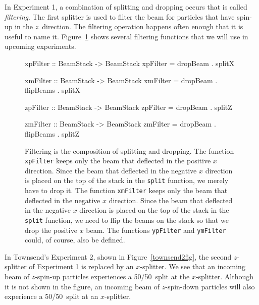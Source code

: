 \documentclass[12pt]{article}
\newcommand{\DataTypeTok}[1]{\textcolor[rgb]{0.56,0.13,0.00}{{#1}}}
\newcommand{\SpecialCharTok}[1]{\textcolor[rgb]{0.25,0.44,0.63}{{#1}}}
\newcommand{\FunctionTok}[1]{\textcolor[rgb]{0.02,0.16,0.49}{{#1}}}
\newcommand{\OperatorTok}[1]{\textcolor[rgb]{0.40,0.40,0.40}{{#1}}}
\begin{document}
In Experiment 1, a combination of splitting and dropping occurs
that is called \emph{filtering}.  The first splitter is used
to filter the beam for particles that have spin-up in the $z$~direction.
The filtering operation happens often enough that it is useful to name
it.  Figure~\ref{expapifilter} shows several filtering functions
that we will use in upcoming experiments.

\begin{figure}
\begin{Highlighting}[]
\FunctionTok{xpFilter} \SpecialCharTok{::} \DataTypeTok{BeamStack} \SpecialCharTok{->} \DataTypeTok{BeamStack}
\FunctionTok{xpFilter} \OperatorTok{=} \FunctionTok{dropBeam} \OperatorTok{.} \FunctionTok{splitX}

\FunctionTok{xmFilter} \SpecialCharTok{::} \DataTypeTok{BeamStack} \SpecialCharTok{->} \DataTypeTok{BeamStack}
\FunctionTok{xmFilter} \OperatorTok{=} \FunctionTok{dropBeam} \OperatorTok{.} \FunctionTok{flipBeams} \OperatorTok{.} \FunctionTok{splitX}

\FunctionTok{zpFilter} \SpecialCharTok{::} \DataTypeTok{BeamStack} \SpecialCharTok{->} \DataTypeTok{BeamStack}
\FunctionTok{zpFilter} \OperatorTok{=} \FunctionTok{dropBeam} \OperatorTok{.} \FunctionTok{splitZ}

\FunctionTok{zmFilter} \SpecialCharTok{::} \DataTypeTok{BeamStack} \SpecialCharTok{->} \DataTypeTok{BeamStack}
\FunctionTok{zmFilter} \OperatorTok{=} \FunctionTok{dropBeam} \OperatorTok{.} \FunctionTok{flipBeams} \OperatorTok{.} \FunctionTok{splitZ}
\end{Highlighting}
\caption{Filtering is the composition of splitting and dropping.
  The function \FunctionTok{\texttt{xpFilter}} keeps only the beam that deflected in the positive $x$ direction.
  Since the beam that deflected in the negative $x$ direction is placed on the top of the stack
  in the \FunctionTok{\texttt{split}} function, we merely have to drop it.
  The function \FunctionTok{\texttt{xmFilter}} keeps only the beam that deflected in the negative $x$ direction.
  Since the beam that deflected in the negative $x$ direction is placed on the top of the stack
  in the \FunctionTok{\texttt{split}} function, we need to flip the beams on the stack so that we
  drop the positive $x$ beam.
  The functions \FunctionTok{\texttt{ypFilter}} and \FunctionTok{\texttt{ymFilter}} could,
  of course, also be defined.
}
\label{expapifilter}
\end{figure}

In Townsend's Experiment 2, shown in Figure~\ref{townsend2fig},
the second $z$-splitter of Experiment 1 is replaced by an $x$-splitter.
We see that an incoming beam of $z$-spin-up particles experiences
a 50/50~split at the $x$-splitter.
Although it is not shown in the figure,
an incoming beam of $z$-spin-down particles will also experience
a 50/50~split at an $x$-splitter.
\end{document}
